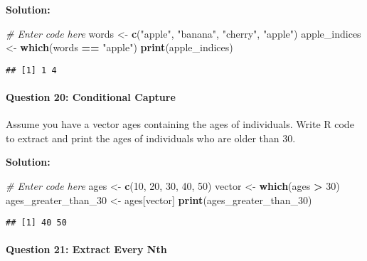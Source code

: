\documentclass[
]{article}
\newenvironment{Shaded}{\begin{snugshade}}{\end{snugshade}}
\newcommand{\CommentTok}[1]{\textcolor[rgb]{0.56,0.35,0.01}{\textit{#1}}}
\newcommand{\DecValTok}[1]{\textcolor[rgb]{0.00,0.00,0.81}{#1}}
\newcommand{\FunctionTok}[1]{\textcolor[rgb]{0.13,0.29,0.53}{\textbf{#1}}}
\newcommand{\NormalTok}[1]{#1}
\newcommand{\OtherTok}[1]{\textcolor[rgb]{0.56,0.35,0.01}{#1}}
\newcommand{\SpecialCharTok}[1]{\textcolor[rgb]{0.81,0.36,0.00}{\textbf{#1}}}
\newcommand{\StringTok}[1]{\textcolor[rgb]{0.31,0.60,0.02}{#1}}
\begin{document}
\textbf{Solution:}

\begin{Shaded}
\begin{Highlighting}[]
\CommentTok{\# Enter code here}
\NormalTok{words }\OtherTok{\textless{}{-}} \FunctionTok{c}\NormalTok{(}\StringTok{"apple"}\NormalTok{, }\StringTok{"banana"}\NormalTok{, }\StringTok{"cherry"}\NormalTok{, }\StringTok{"apple"}\NormalTok{)}
\NormalTok{apple\_indices }\OtherTok{\textless{}{-}} \FunctionTok{which}\NormalTok{(words }\SpecialCharTok{==} \StringTok{"apple"}\NormalTok{)}
\FunctionTok{print}\NormalTok{(apple\_indices)}
\end{Highlighting}
\end{Shaded}

\begin{verbatim}
## [1] 1 4
\end{verbatim}

\hypertarget{question-20-conditional-capture}{%
\paragraph{Question 20: Conditional
Capture}\label{question-20-conditional-capture}}

Assume you have a vector ages containing the ages of individuals. Write
R code to extract and print the ages of individuals who are older than
30.

\textbf{Solution:}

\begin{Shaded}
\begin{Highlighting}[]
\CommentTok{\# Enter code here}
\NormalTok{ages }\OtherTok{\textless{}{-}} \FunctionTok{c}\NormalTok{(}\DecValTok{10}\NormalTok{, }\DecValTok{20}\NormalTok{, }\DecValTok{30}\NormalTok{, }\DecValTok{40}\NormalTok{, }\DecValTok{50}\NormalTok{)}
\NormalTok{vector }\OtherTok{\textless{}{-}} \FunctionTok{which}\NormalTok{(ages }\SpecialCharTok{\textgreater{}} \DecValTok{30}\NormalTok{)}
\NormalTok{ages\_greater\_than\_30 }\OtherTok{\textless{}{-}}\NormalTok{ ages[vector]}
\FunctionTok{print}\NormalTok{(ages\_greater\_than\_30)}
\end{Highlighting}
\end{Shaded}

\begin{verbatim}
## [1] 40 50
\end{verbatim}

\hypertarget{question-21-extract-every-nth}{%
\paragraph{Question 21: Extract Every
Nth}\label{question-21-extract-every-nth}}
\end{document}
